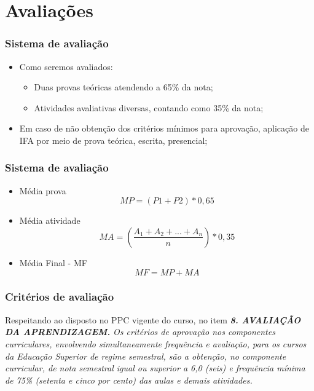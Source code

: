 \documentclass{beamer}
\begin{document}
\section{Avaliações}

\begin{frame}[fragile]\justifying
\frametitle{Sistema de avaliação}
\begin{itemize}
            
            \item Como seremos avaliados:
            \begin{itemize}
                  \item Duas provas teóricas atendendo a 65\% da nota;
                  \item Atividades avaliativas diversas, contando como 35\% da nota;
            \end{itemize}
            \item Em caso de não obtenção dos critérios mínimos para aprovação, aplicação de IFA por meio de prova teórica, escrita, presencial;
\end{itemize}


\end{frame}


\begin{frame}[fragile]\justifying
      \frametitle{Sistema de avaliação}
      \begin{itemize}
            \item Média prova \[ MP = ( P1 + P2 ) * 0,65 \]
            \item Média atividade \[ MA = \left ( \frac{A_1 + A_2 + ... + A_n}n \right ) * 0,35 \]
            \item Média Final - MF \[MF = MP + MA\]
      \end{itemize}
      
      \end{frame}
      \footlinecolor{}

\begin{frame}[fragile]\justifying
      \frametitle{Critérios de avaliação}
      Respeitando ao disposto no PPC vigente do curso, no item \textbf{\textit{8. AVALIAÇÃO DA APRENDIZAGEM. }}
      \newline
      \newline
      \textit{Os critérios de aprovação nos componentes curriculares, envolvendo simultaneamente frequência e avaliação, para os cursos da Educação Superior de 
      regime semestral, são a obtenção, no componente curricular, de nota semestral igual ou superior a 6,0 (seis) e frequência mínima de 75\% (setenta e cinco por cento) das
      aulas e demais atividades. }
\end{frame}
\end{document}
